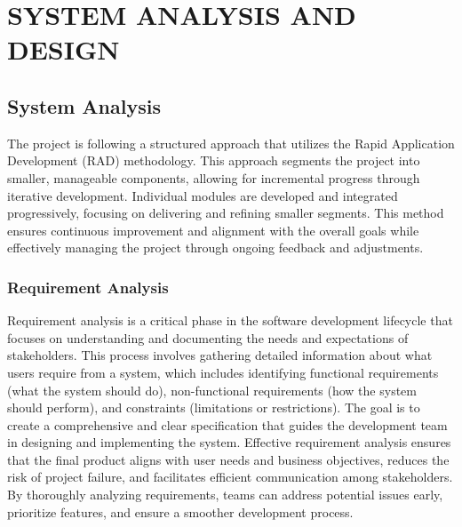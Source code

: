 \chapter{SYSTEM ANALYSIS AND DESIGN}
\section{System Analysis}
The project is following a structured approach that utilizes the Rapid Application Development (RAD) methodology. This approach segments the project into smaller, manageable components, allowing for incremental progress through iterative development. Individual modules are developed and integrated progressively, focusing on delivering and refining smaller segments. This method ensures continuous improvement and alignment with the overall goals while effectively managing the project through ongoing feedback and adjustments.
\subsection{Requirement Analysis}
Requirement analysis is a critical phase in the software development lifecycle that focuses on understanding and documenting the needs and expectations of stakeholders. This process involves gathering detailed information about what users require from a system, which includes identifying functional requirements (what the system should do), non-functional requirements (how the system should perform), and constraints (limitations or restrictions). The goal is to create a comprehensive and clear specification that guides the development team in designing and implementing the system. Effective requirement analysis ensures that the final product aligns with user needs and business objectives, reduces the risk of project failure, and facilitates efficient communication among stakeholders. By thoroughly analyzing requirements, teams can address potential issues early, prioritize features, and ensure a smoother development process.
